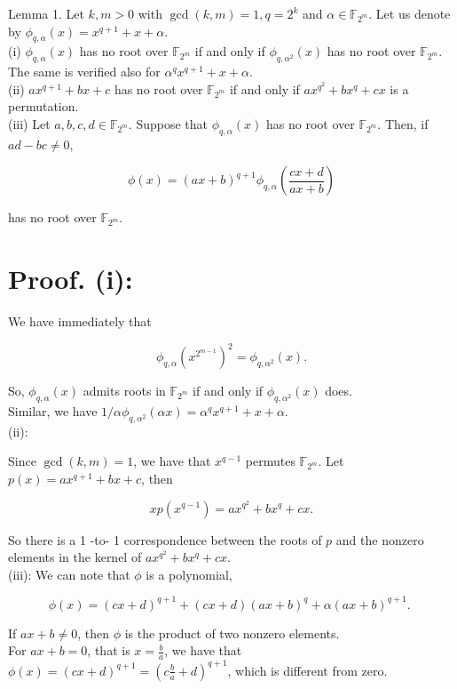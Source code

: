 \documentclass[10pt]{article}
\begin{document}
Lemma 1. Let $k, m>0$ with $\operatorname{gcd}(k, m)=1, q=2^{k}$ and $\alpha \in \mathbb{F}_{2^{m}}$. Let us denote by $\phi_{q, \alpha}(x)=x^{q+1}+x+\alpha$.\\
(i) $\phi_{q, \alpha}(x)$ has no root over $\mathbb{F}_{2^{m}}$ if and only if $\phi_{q, \alpha^{2}}(x)$ has no root over $\mathbb{F}_{2^{m}}$. The same is verified also for $\alpha^{q} x^{q+1}+x+\alpha$.\\
(ii) $a x^{q+1}+b x+c$ has no root over $\mathbb{F}_{2^{m}}$ if and only if $a x^{q^{2}}+b x^{q}+c x$ is a permutation.\\
(iii) Let $a, b, c, d \in \mathbb{F}_{2^{m}}$. Suppose that $\phi_{q, \alpha}(x)$ has no root over $\mathbb{F}_{2^{m}}$. Then, if $a d-b c \neq 0$,

$$
\phi(x)=(a x+b)^{q+1} \phi_{q, \alpha}\left(\frac{c x+d}{a x+b}\right)
$$

has no root over $\mathbb{F}_{2^{m}}$.

\section*{Proof. (i):}
We have immediately that

$$
\phi_{q, \alpha}\left(x^{2^{m-1}}\right)^{2}=\phi_{q, \alpha^{2}}(x) .
$$

So, $\phi_{q, \alpha}(x)$ admits roots in $\mathbb{F}_{2^{m}}$ if and only if $\phi_{q, \alpha^{2}}(x)$ does.\\
Similar, we have $1 / \alpha \phi_{q, \alpha^{2}}(\alpha x)=\alpha^{q} x^{q+1}+x+\alpha$.\\
(ii):

Since $\operatorname{gcd}(k, m)=1$, we have that $x^{q-1}$ permutes $\mathbb{F}_{2^{m}}$. Let $p(x)=a x^{q+1}+b x+c$, then

$$
x p\left(x^{q-1}\right)=a x^{q^{2}}+b x^{q}+c x .
$$

So there is a 1 -to- 1 correspondence between the roots of $p$ and the nonzero elements in the kernel of $a x^{q^{2}}+b x^{q}+c x$.\\
(iii): We can note that $\phi$ is a polynomial,

$$
\phi(x)=(c x+d)^{q+1}+(c x+d)(a x+b)^{q}+\alpha(a x+b)^{q+1} \text {. }
$$

If $a x+b \neq 0$, then $\phi$ is the product of two nonzero elements.\\
For $a x+b=0$, that is $x=\frac{b}{a}$, we have that $\phi(x)=(c x+d)^{q+1}=\left(c \frac{b}{a}+d\right)^{q+1}$, which is different from zero.
\end{document}
